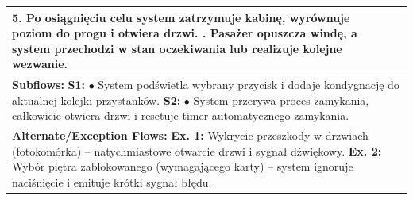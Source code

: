 \documentclass[12pt,a4paper]{article}
\begin{document}
\begin{table}[h!]
\begin{tabular}{|p{}|p{}|p{}|}
{5. Po osiągnięciu celu system zatrzymuje kabinę, wyrównuje poziom do progu i otwiera drzwi. \newline
6. Pasażer opuszcza windę, a system przechodzi w stan oczekiwania lub realizuje kolejne wezwanie.} \\ \hline
\multicolumn{3}{|p{0.9\textwidth}|}{\textbf{Subflows:} \newline
\textbf{S1:} \newline
\hspace*{10pt} $\bullet$ System podświetla wybrany przycisk i dodaje kondygnację do aktualnej kolejki przystanków. \newline
\textbf{S2:} \newline
\hspace*{10pt} $\bullet$ System przerywa proces zamykania, całkowicie otwiera drzwi i resetuje timer automatycznego zamykania.} \\ \hline
\multicolumn{3}{|p{0.9\textwidth}|}{\textbf{Alternate/Exception Flows:} \newline
\textbf{Ex. 1:} Wykrycie przeszkody w drzwiach (fotokomórka) – natychmiastowe otwarcie drzwi i sygnał dźwiękowy. \newline
\textbf{Ex. 2:} Wybór piętra zablokowanego (wymagającego karty) – system ignoruje naciśnięcie i emituje krótki sygnał błędu.} \\ \hline
\end{tabular}
\end{table}
\end{document}
